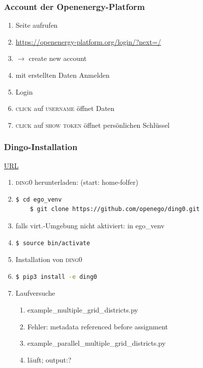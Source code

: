 \documentclass[
a4paper,     %
12pt         %
]{scrartcl}  %
\begin{document}
\subsubsection{Account der Openenergy-Platform}
\label{acc-oedb}
\begin{enumerate}
	\item Seite aufrufen
	\item[] \url{https://openenergy-platform.org/login/?next=/}
	\item $\rightarrow$ create new account
	\item mit erstellten Daten Anmelden
	\item Login
	\item \textsc{click} auf \textsc{username} öffnet Daten
	\item \textsc{click} auf \textsc{show token} öffnet persönlichen Schlüssel
\end{enumerate}

\subsubsection{Dingo-Installation}
\url{URL}
\begin{enumerate}
	\item \textsc{ding0} herunterladen: (start: home-folfer)
	\item[] \begin{lstlisting}[language=bash]
	$ cd ego_venv
	$ git clone https://github.com/openego/ding0.git
	\end{lstlisting}
	\item[] falls virt.-Umgebung nicht aktiviert: in \glqq ego\_venv \grqq
	\item[] \begin{lstlisting}[language=bash]
	$ source bin/activate
	\end{lstlisting}
	
	\item Installation von \textsc{ding0}
	\item[] \begin{lstlisting}[language=bash]
	$ pip3 install -e ding0
	\end{lstlisting}
	
	\item Laufversuche
	\begin{enumerate}
		\item example\_multiple\_grid\_districts.py
		\item[] Fehler: metadata referenced before assignment
		\item  example\_parallel\_multiple\_grid\_districts.py
		\item[] läuft; output:?
	\end{enumerate}
\end{enumerate}
\end{document}
